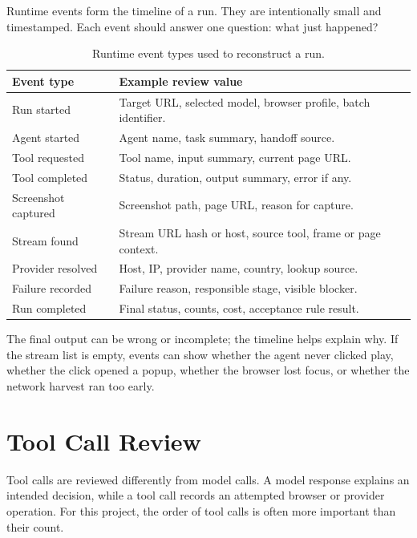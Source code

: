Runtime events form the timeline of a run. They are intentionally small and
timestamped. Each event should answer one question: what just happened?

\begin{table}[!htbp]
\centering
\begin{tabularx}{\textwidth}{Q{3.7cm}Y}
\toprule
{}
Event type & Example review value \\
\midrule
Run started & Target URL, selected model, browser profile, batch identifier. \\
Agent started & Agent name, task summary, handoff source. \\
Tool requested & Tool name, input summary, current page URL. \\
Tool completed & Status, duration, output summary, error if any. \\
Screenshot captured & Screenshot path, page URL, reason for capture. \\
Stream found & Stream URL hash or host, source tool, frame or page context. \\
Provider resolved & Host, IP, provider name, country, lookup source. \\
Failure recorded & Failure reason, responsible stage, visible blocker. \\
Run completed & Final status, counts, cost, acceptance rule result. \\
\bottomrule
\end{tabularx}
\caption{Runtime event types used to reconstruct a run.}
\label{tab:runtime-event-types}
\end{table}

The final output can be wrong or incomplete; the timeline helps explain why. If
the stream list is empty, events can show whether the agent never clicked play,
whether the click opened a popup, whether the browser lost focus, or whether the
network harvest ran too early.

\section{Tool Call Review}

Tool calls are reviewed differently from model calls. A model response explains
an intended decision, while a tool call records an attempted browser or provider
operation. For this project, the order of tool calls is often more important
than their count.

